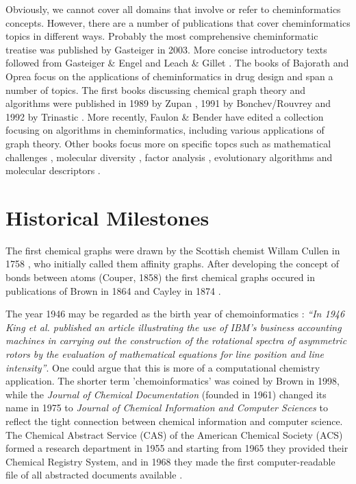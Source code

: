 \documentclass{sig-alternate}
\begin{document}
Obviously, we cannot cover all domains that involve or refer to
cheminformatics concepts. However, there are a number of publications
that cover cheminformatics topics in different ways.  Probably the
most comprehensive cheminformatic treatise was published by Gasteiger
\cite{Gasteiger2003} in 2003.  More concise introductory texts
followed from Gasteiger \& Engel \cite{gasteigerengel2003} and Leach
\& Gillet \cite{leachgillet2007}.  The books of Bajorath
\cite{Bajorath2004} and Oprea \cite{oprea2005} focus on the
applications of cheminformatics in drug design and span a number of
topics. The first books discussing chemical graph theory and
algorithms were published in 1989 by Zupan \cite{zupan1989}, 1991 by
Bonchev/Rouvrey \cite{bonchevrouvrey1991,bonchevrouvrey2003} and 1992
by Trinastic \cite{Trinajstic1992}.  More recently, Faulon \& Bender
\cite{faulon2010} have edited a collection focusing on algorithms in
cheminformatics, including various applications of graph theory.
Other books focus more on specific topcs such as mathematical
challenges \cite{mathchallenges1995}, molecular diversity
\cite{moleculardiversity1999}, factor analysis \cite{Malinowski2002},
evolutionary algorithms \cite{clark2000} and molecular descriptors
\cite{todeschini2000}.

\section{Historical Milestones}
The first chemical graphs were drawn by the Scottish chemist Willam
Cullen in 1758 \cite{bonchevrouvrey1991}, who initially called them
affinity graphs.  After developing the concept of bonds between atoms
(Couper, 1858) the first chemical graphs occured in publications of
Brown in 1864 and Cayley in 1874 \cite{bonchevrouvrey1991,brown2009}.

The year 1946 may be regarded as the birth year of chemoinformatics
\cite{Chen2006}: \textit{``In 1946 King et al.\cite{kct1946} published
  an article illustrating the use of IBM's business accounting
  machines in carrying out the construction of the rotational spectra
  of asymmetric rotors by the evaluation of mathematical equations for
  line position and line intensity''}. One could argue that this is
more of a computational chemistry application. The shorter term
'chemoinformatics' was coined by Brown in 1998\cite{brown1998}, while
the \textit{Journal of Chemical Documentation} (founded in 1961)
changed its name in 1975 to \textit{Journal of Chemical Information
  and Computer Sciences} to reflect the tight connection between
chemical information and computer science. The Chemical Abstract
Service (CAS) of the American Chemical Society (ACS) formed a research
department in 1955 and starting from 1965 they provided their Chemical
Registry System, and in 1968 they made the first computer-readable
file of all abstracted documents available \cite{Chen2006}.  
\end{document}
